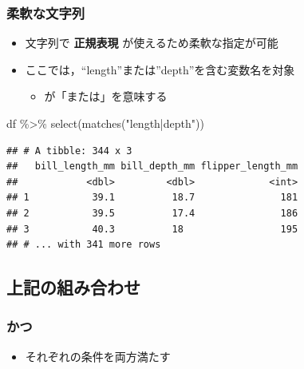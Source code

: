 \documentclass[
  xelatex,ja=standard, b5paper]{bxjsbook}
\newenvironment{Shaded}{\begin{snugshade}}{\end{snugshade}}
\newcommand{\FunctionTok}[1]{\textcolor[rgb]{0.00,0.00,0.00}{#1}}
\newcommand{\NormalTok}[1]{#1}
\newcommand{\SpecialCharTok}[1]{\textcolor[rgb]{0.00,0.00,0.00}{#1}}
\newcommand{\StringTok}[1]{\textcolor[rgb]{0.31,0.60,0.02}{#1}}
\providecommand{\tightlist}{%
  \setlength{\itemsep}{0pt}\setlength{\parskip}{0pt}}
\begin{document}
\hypertarget{select-helper4}{%
\subsubsection{柔軟な文字列}\label{select-helper4}}

\begin{itemize}
\tightlist
\item
  文字列で \textbf{正規表現} が使えるため柔軟な指定が可能
\item
  ここでは，``length''または''depth''を含む変数名を対象

  \begin{itemize}
  \tightlist
  \item
    \texttt{\textbar{}}が「または」を意味する
  \end{itemize}
\end{itemize}

\begin{Shaded}
\begin{Highlighting}[]
\NormalTok{df }\SpecialCharTok{\%\textgreater{}\%}
  \FunctionTok{select}\NormalTok{(}\FunctionTok{matches}\NormalTok{(}\StringTok{"length|depth"}\NormalTok{))}
\end{Highlighting}
\end{Shaded}

\begin{verbatim}
## # A tibble: 344 x 3
##   bill_length_mm bill_depth_mm flipper_length_mm
##            <dbl>         <dbl>             <int>
## 1           39.1          18.7               181
## 2           39.5          17.4               186
## 3           40.3          18                 195
## # ... with 341 more rows
\end{verbatim}

\hypertarget{select-helper5}{%
\subsection{上記の組み合わせ}\label{select-helper5}}

\hypertarget{select-helper5-1}{%
\subsubsection{かつ}\label{select-helper5-1}}

\begin{itemize}
\tightlist
\item
  それぞれの条件を両方満たす
\end{itemize}
\end{document}
